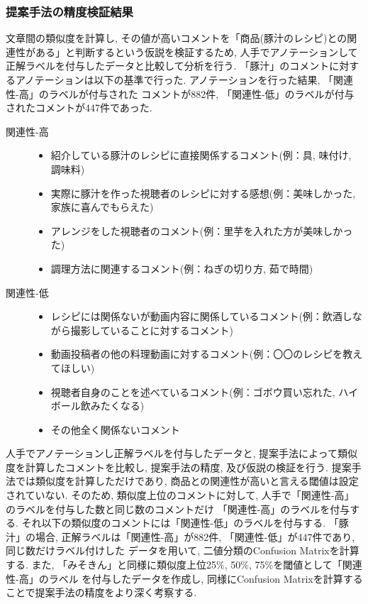 \documentclass{ltjarticle}
\begin{document}
\subsubsection{提案手法の精度検証結果}
文章間の類似度を計算し, その値が高いコメントを「商品(豚汁のレシピ)との関連性がある」と判断するという仮説を検証するため, 
人手でアノテーションして正解ラベルを付与したデータと比較して分析を行う. 
「豚汁」のコメントに対するアノテーションは以下の基準で行った. アノテーションを行った結果, 「関連性-高」のラベルが付与された
コメントが882件, 「関連性-低」のラベルが付与されたコメントが447件であった. 
\vspace{10truept}

\begin{description}
    \item[関連性-高]\mbox{}
    \begin{itemize}
        \item 紹介している豚汁のレシピに直接関係するコメント(例：具, 味付け, 調味料)
        \item 実際に豚汁を作った視聴者のレシピに対する感想(例：美味しかった, 家族に喜んでもらえた)
        \item アレンジをした視聴者のコメント(例：里芋を入れた方が美味しかった)
        \item 調理方法に関連するコメント(例：ねぎの切り方, 茹で時間)
    \end{itemize}
    \item[関連性-低] \mbox{}
    \begin{itemize}
        \item レシピには関係ないが動画内容に関係しているコメント(例：飲酒しながら撮影していることに対するコメント)
        \item 動画投稿者の他の料理動画に対するコメント(例：〇〇のレシピを教えてほしい)
        \item 視聴者自身のことを述べているコメント(例：ゴボウ買い忘れた, ハイボール飲みたくなる)
        \item その他全く関係ないコメント
    \end{itemize}
\end{description}
\vspace{10truept}

人手でアノテーションし正解ラベルを付与したデータと, 提案手法によって類似度を計算したコメントを比較し, 
提案手法の精度, 及び仮説の検証を行う. 
提案手法では類似度を計算しただけであり, 商品との関連性が高いと言える閾値は設定されていない. 
そのため, 類似度上位のコメントに対して, 人手で「関連性-高」のラベルを付与した数と同じ数のコメントだけ
「関連性-高」のラベルを付与する. 
それ以下の類似度のコメントには「関連性-低」のラベルを付与する. 
「豚汁」の場合, 正解ラベルは「関連性-高」が882件, 「関連性-低」が447件であり, 同じ数だけラベル付けした
データを用いて, 二値分類のConfusion Matrixを計算する. 
また, 「みそきん」と同様に類似度上位25\%, 50\%, 75\%を閾値として「関連性-高」のラベル
を付与したデータを作成し, 同様にConfusion Matrixを計算することで提案手法の精度をより深く考察する. 
\end{document}
